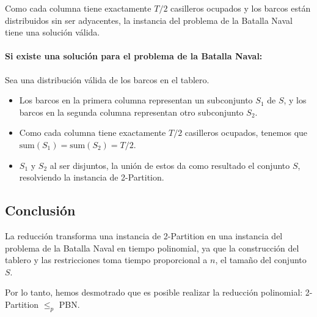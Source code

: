 Como cada columna tiene exactamente $T / 2$ casilleros ocupados y los barcos están distribuidos sin ser adyacentes, la instancia del problema de la Batalla Naval tiene una solución válida.

\paragraph{Si existe una solución para el problema de la Batalla Naval:}


Sea una distribución válida de los barcos en el tablero.  

\begin{itemize}
    \item Los barcos en la primera columna representan un subconjunto $S_1$ de $S$, y los barcos en la segunda columna representan otro subconjunto $S_2$.
    \item Como cada columna tiene exactamente $T / 2$ casilleros ocupados, tenemos que $\text{sum}(S_1) = \text{sum}(S_2) = T / 2$.
    \item $S_1$ y $S_2$ al ser disjuntos, la unión de estos da como resultado el conjunto $S$, resolviendo la instancia de 2-Partition.
\end{itemize}

\subsection*{Conclusión}

La reducción transforma una instancia de 2-Partition en una instancia del problema de la Batalla Naval en tiempo polinomial, ya que la construcción del tablero y las restricciones toma tiempo proporcional a $n$, el tamaño del conjunto $S$.

Por lo tanto, hemos desmotrado que es posible realizar la reducción polinomial: 2-Partition $\leq_p$ PBN.

